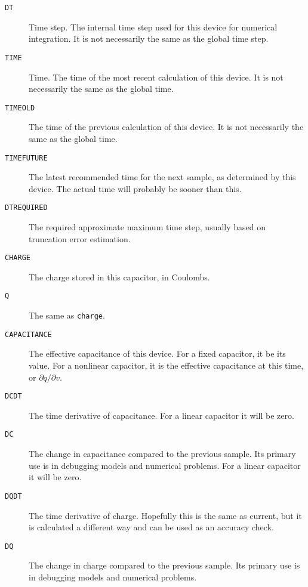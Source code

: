 \begin{description}
  
\item[{\tt DT}]
Time step.  The internal time step used for this device for numerical
integration.  It is not necessarily the same as the global time step.
  
\item[{\tt TIME}]
Time.  The time of the most recent calculation of this device.  It is
not necessarily the same as the global time.
  
\item[{\tt TIMEOLD}] 
The time of the previous calculation of this device.  It is not
necessarily the same as the global time.
  
\item[{\tt TIMEFUTURE}]
The latest recommended time for the next sample, as determined by this
device.  The actual time will probably be sooner than this.

\item[{\tt DTREQUIRED}]
The required approximate maximum time step, usually based on
truncation error estimation.
  
\item[{\tt CHARGE}]
The charge stored in this capacitor, in Coulombs.
  
\item[{\tt Q}]
The same as {\tt charge}.
  
\item[{\tt CAPACITANCE}]
The effective capacitance of this device.  For a fixed capacitor, it
be its value.  For a nonlinear capacitor, it is the effective
capacitance at this time, or $\partial q / \partial v$.
  
\item[{\tt DCDT}]
The time derivative of capacitance.  For a linear capacitor it will be
zero.
  
\item[{\tt DC}]
The change in capacitance compared to the previous sample.  Its
primary use is in debugging models and numerical problems.  For a
linear capacitor it will be zero.
  
\item[{\tt DQDT}]
The time derivative of charge.  Hopefully this is the same as current,
but it is calculated a different way and can be used as an accuracy
check.
  
\item[{\tt DQ}]
The change in charge compared to the previous sample.  Its primary use
is in debugging models and numerical problems.

\end{description}
